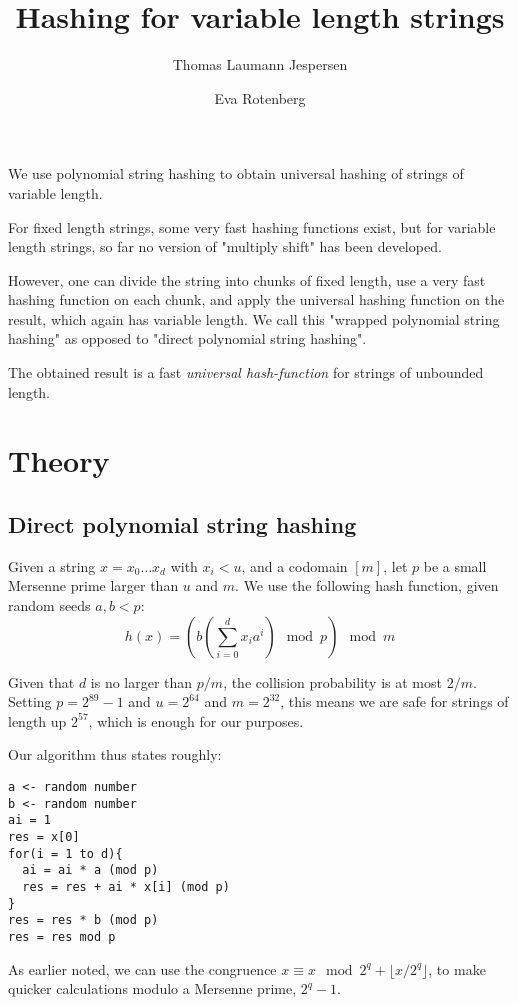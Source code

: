 \documentclass[]{article}
\title{Hashing for variable length strings}
\author{Thomas Laumann Jespersen \and Eva Rotenberg}
\begin{document}
\maketitle

We use polynomial string hashing to obtain universal hashing of strings of variable length.

For fixed length strings, some very fast hashing functions exist, but for variable length strings, so far no version of "multiply shift" has been developed. 

However, one can divide the string into chunks of fixed length, use a very fast hashing function on each chunk, and apply the universal hashing function on the result, which again has variable length. We call this "wrapped polynomial string hashing" as opposed to "direct polynomial string hashing".

The obtained result is a fast \emph{universal hash-function} for strings of unbounded length. %

\section{Theory}

\subsection*{Direct polynomial string hashing}

Given a string $x=x_0 \ldots x_d$ with $x_i < u$, and a codomain $[m]$, let $p$ be a small Mersenne prime larger than $u$ and $m$. We use the following hash function, given random seeds $a,b < p$:
\[h(x)= \left( b \left( \sum_{i=0}^{d}x_i a^i \right) \mod p \right) \mod m \]

Given that $d$ is no larger than $p/m$, the collision probability is at most $2/m$. Setting $p=2^{89}-1$ and $u=2^{64}$ and $m=2^{32}$, this means we are safe for strings of length up $2^{57}$, which is enough for our purposes.

Our algorithm thus states roughly:

\begin{verbatim}
a <- random number
b <- random number
ai = 1
res = x[0]
for(i = 1 to d){
  ai = ai * a (mod p)
  res = res + ai * x[i] (mod p)
}
res = res * b (mod p)
res = res mod p
\end{verbatim}

As earlier noted, we can use the congruence $x \equiv x\mod 2^q + \lfloor x / 2^q \rfloor$, to make quicker calculations modulo a Mersenne prime, $2^q -1$.
\end{document}
